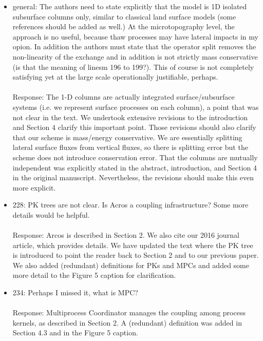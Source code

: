 \documentclass[12pt]{article}\usepackage{amsmath, amssymb, graphicx, array}
\begin{document}
\begin{itemize}

\item general: The authors need to state explicitly that the model is 1D isolated subsurface columns only, similar to classical land surface models (some references should be added as well.) At the microtopography level, the approach is no useful, because thaw processes may have lateral impacts in my opion. In addition the authors must state that the operator split removes the non-linearity of the exchange and in addition is not strictly mass conservative (is that the meaning of linesm 196 to 199?). This of course is not completely satisfying yet at the large scale operationally justifiable, perhaps. \\ \\
Response: The 1-D columns are actually integrated surface/subsurface systems (i.e. we represent surface processes on each column), a point that was not clear in the text. We undertook extensive revisions to the introduction and Section 4 clarify this important point. Those revisions should also clarify that our scheme is mass/energy conservative. We are essentially splitting lateral surface fluxes from vertical fluxes, so there is splitting error but the scheme does not introduce conservation error. That the columns are mutually independent was explicitly stated in the abstract, introduction, and Section 4 in the original manuscript.  Nevertheless, the revisions should make this even more explicit. 

\item 228: PK trees are not clear. Is Acros a coupling infrastructure? Some more details would be helpful. \\ \\
Response: Arcos is described in Section 2. We also cite our 2016 journal article, which provides details. 
We have updated the text where the PK tree is introduced to point the reader back to Section 2 and to our previous paper. We also added (redundant) definitions for PKs and MPCs and added some more detail to the Figure 5 caption for clarification. 

\item 234: Perhaps I missed it, what is MPC? \\ \\ 
Response: Multiprocess Coordinator manages the coupling among process kernels, as described in Section 2. A (redundant) definition was added in Section 4.3 and in the Figure 5 caption. 


\end{itemize}
\end{document}
